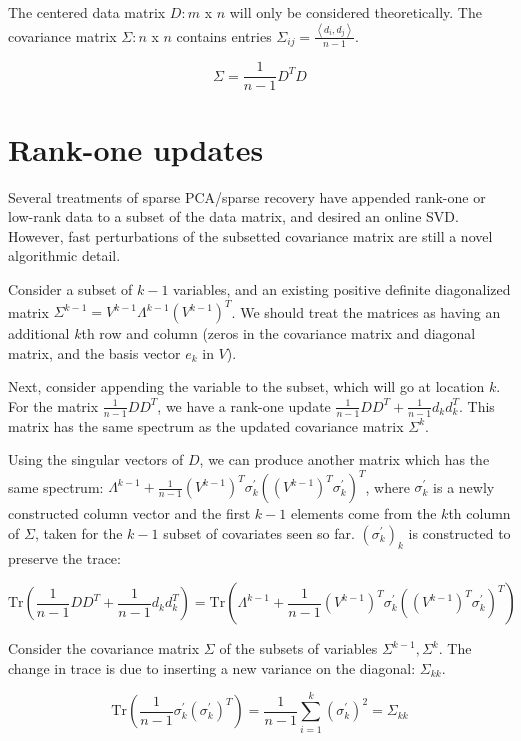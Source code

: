 \documentclass{article}
\begin{document}
The centered data matrix $D: m$ x $n$ will only be considered theoretically. The covariance matrix $\Sigma: n$ x $n$ contains entries $\Sigma_{ij} = \frac{\left< d_i, d_j \right>}{n-1}$.

$$\Sigma = \frac{1}{n-1} D^T D$$

\section{Rank-one updates}

Several treatments of sparse PCA/sparse recovery have appended rank-one or low-rank data to a subset of the data matrix, and desired an online SVD. However, fast perturbations of the subsetted covariance matrix are still a novel algorithmic detail.

Consider a subset of $k-1$ variables, and an existing positive definite diagonalized matrix $\Sigma^{k-1} = V^{k-1} \Lambda^{k-1} \left(V^{k-1}\right)^T$. We should treat the matrices as having an additional $k$th row and column (zeros in the covariance matrix and diagonal matrix, and the basis vector $e_k$ in $V$).

Next, consider appending the variable to the subset, which will go at location $k$. For the matrix $\frac{1}{n-1} D D^T$, we have a rank-one update $\frac{1}{n-1} D D^T + \frac{1}{n-1} d_k d_k^T$. This matrix has the same spectrum as the updated covariance matrix $\Sigma^k$.

Using the singular vectors of $D$, we can produce another matrix which has the same spectrum: $\Lambda^{k-1} + \frac{1}{n-1} \left(V^{k-1}\right)^T\sigma_k^\prime (\left(V^{k-1}\right)^T \sigma_k^\prime)^T$, where $\sigma_k^\prime$ is a newly constructed column vector and the first $k-1$ elements come from the $k$th column of $\Sigma$, taken for the $k-1$ subset of covariates seen so far. $\left(\sigma_k^\prime\right)_k$ is constructed to preserve the trace:

$$
\text{Tr}\left(\frac{1}{n-1} D D^T + \frac{1}{n-1} d_k d_k^T\right)
= \text{Tr}\left( \Lambda^{k-1} + \frac{1}{n-1} \left(V^{k-1}\right)^T\sigma_k^\prime (\left(V^{k-1}\right)^T \sigma_k^\prime)^T \right)
$$

Consider the covariance matrix $\Sigma$ of the subsets of variables $\Sigma^{k-1}, \Sigma^k$. The change in trace is due to inserting a new variance on the diagonal: $\Sigma_{kk}$.

$$
\text{Tr}\left( \frac{1}{n-1} \sigma_k^\prime \left(\sigma_k^\prime\right)^T \right) = \frac{1}{n-1} \sum_{i=1}^k \left(\sigma_k^\prime\right)^2 = \Sigma_{kk}
$$
\end{document}
